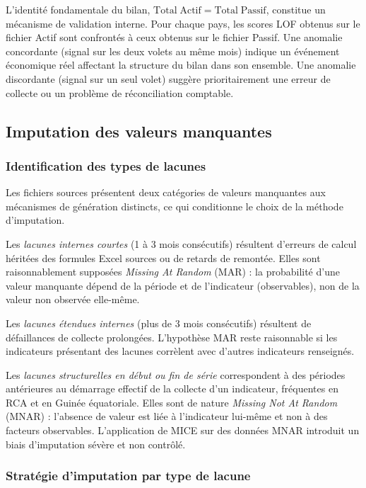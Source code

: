 \documentclass[12pt,a4paper]{article}
\begin{document}
L'identité fondamentale du bilan, $\mathrm{Total\;Actif} =
\mathrm{Total\;Passif}$, constitue un mécanisme de validation interne. Pour
chaque pays, les scores LOF obtenus sur le fichier Actif sont confrontés à
ceux obtenus sur le fichier Passif. Une anomalie concordante (signal sur les
deux volets au même mois) indique un événement économique réel affectant la
structure du bilan dans son ensemble. Une anomalie discordante (signal sur
un seul volet) suggère prioritairement une erreur de collecte ou un problème
de réconciliation comptable.

\subsection{Imputation des valeurs manquantes}

\subsubsection{Identification des types de lacunes}

Les fichiers sources présentent deux catégories de valeurs manquantes
aux mécanismes de génération distincts, ce qui conditionne le choix de
la méthode d'imputation.

Les \textit{lacunes internes courtes} (1 à 3 mois consécutifs) résultent
d'erreurs de calcul héritées des formules Excel sources ou de retards de
remontée. Elles sont raisonnablement supposées \textit{Missing At Random}
(MAR) : la probabilité d'une valeur manquante dépend de la période et de
l'indicateur (observables), non de la valeur non observée elle-même.

Les \textit{lacunes étendues internes} (plus de 3 mois consécutifs) résultent
de défaillances de collecte prolongées. L'hypothèse MAR reste raisonnable si
les indicateurs présentant des lacunes corrèlent avec d'autres indicateurs
renseignés.

Les \textit{lacunes structurelles en début ou fin de série} correspondent à
des périodes antérieures au démarrage effectif de la collecte d'un indicateur,
fréquentes en RCA et en Guinée équatoriale. Elles sont de nature
\textit{Missing Not At Random} (MNAR) : l'absence de valeur est liée à
l'indicateur lui-même et non à des facteurs observables. L'application de
MICE sur des données MNAR introduit un biais d'imputation sévère et non
contrôlé.

\subsubsection{Stratégie d'imputation par type de lacune}
\end{document}
